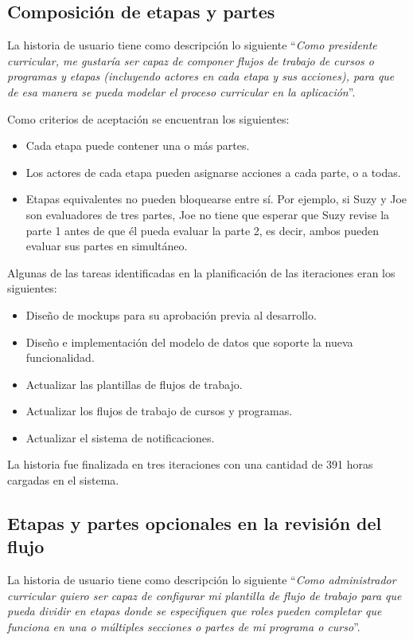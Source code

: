 \subsection{Composición de etapas y partes}
La historia de usuario tiene como descripción lo siguiente \enquote{\textit{Como presidente curricular, me gustaría ser capaz de componer flujos de trabajo de cursos o programas y etapas (incluyendo actores en cada etapa y sus acciones), para que de esa manera se pueda modelar el proceso curricular en la aplicación}}.

Como criterios de aceptación se encuentran los siguientes:
\begin{itemize}
	\item Cada etapa puede contener una o más partes.
	\item Los actores de cada etapa pueden asignarse acciones a cada parte, o a todas.
	\item Etapas equivalentes no pueden bloquearse entre sí. Por ejemplo, si Suzy y Joe son evaluadores de tres partes, Joe no tiene que esperar que Suzy revise la parte 1 antes de que él pueda evaluar la parte 2, es decir, ambos pueden evaluar sus partes en simultáneo.
\end{itemize}

Algunas de las tareas identificadas en la planificación de las iteraciones eran los siguientes:
\begin{itemize}
	\item Diseño de mockups para su aprobación previa al desarrollo.
	\item Diseño e implementación del modelo de datos que soporte la nueva funcionalidad.
	\item Actualizar las plantillas de flujos de trabajo.
	\item Actualizar los flujos de trabajo de cursos y programas.
	\item Actualizar el sistema de notificaciones.
\end{itemize}

La historia fue finalizada en tres iteraciones con una cantidad de 391 horas cargadas en el sistema.

\subsection{Etapas y partes opcionales en la revisión del flujo}
La historia de usuario tiene como descripción lo siguiente \enquote{\textit{Como administrador curricular quiero ser capaz de configurar mi plantilla de flujo de trabajo para que pueda dividir en etapas donde se especifiquen que roles pueden completar que funciona en una o múltiples secciones o partes de mi programa o curso}}.

